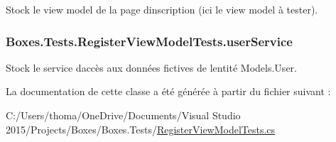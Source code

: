 Stock le view model de la page d\textquotesingle{}inscription (ici le view model à tester). 

\subsubsection[{\texorpdfstring{user\+Service}{userService}}]{ Boxes.\+Tests.\+Register\+View\+Model\+Tests.\+user\+Service\hspace{0.3cm}{\ttfamily [private]}}\hypertarget{class_boxes_1_1_tests_1_1_register_view_model_tests_ab475cc520bf312586e83fd23a22dcf1c}{}\label{class_boxes_1_1_tests_1_1_register_view_model_tests_ab475cc520bf312586e83fd23a22dcf1c}


Stock le service d\textquotesingle{}accès aux données fictives de l\textquotesingle{}entité Models.\+User. 



La documentation de cette classe a été générée à partir du fichier suivant \+:\begin{DoxyCompactItemize}
\item 
C\+:/\+Users/thoma/\+One\+Drive/\+Documents/\+Visual Studio 2015/\+Projects/\+Boxes/\+Boxes.\+Tests/\hyperlink{_register_view_model_tests_8cs}{Register\+View\+Model\+Tests.\+cs}\end{DoxyCompactItemize}

